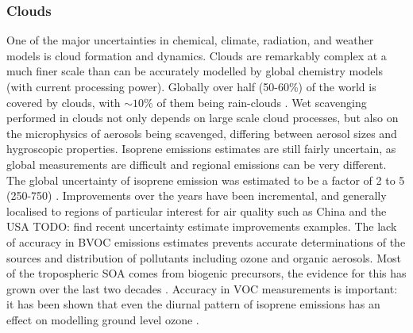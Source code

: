     \subsubsection{Clouds}
      \label{LR:Models:Uncert:Clouds}
      One of the major uncertainties in chemical, climate, radiation, and weather models is cloud formation and dynamics.
      Clouds are remarkably complex at a much finer scale than can be accurately modelled by global chemistry models (with current processing power).
      Globally over half (50-60\%) of the world is covered by clouds, with $\sim10\%$ of them being rain-clouds \citep{Kanakidou2005}.
      Wet scavenging performed in clouds not only depends on large scale cloud processes, but also on the microphysics of aerosols being scavenged, differing between aerosol sizes and hygroscopic properties.
      Isoprene emissions estimates are still fairly uncertain, as global measurements are difficult and regional emissions can be very different. 
      The global uncertainty of isoprene emission was estimated to be a factor of 2 to 5 (250-750\tgpyr) \citep{Kanakidou2005}.
      Improvements over the years have been incremental, and generally localised to regions of particular interest for air quality such as China and the USA TODO: find recent uncertainty estimate improvements examples.
      The lack of accuracy in BVOC emissions estimates prevents accurate determinations of the sources and distribution of pollutants including ozone and organic aerosols.
      Most of the tropospheric SOA comes from biogenic precursors, the evidence for this has grown over the last two decades \citep{Guenther1995, Kanakidou2005,Guenther2012}.
      Accuracy in VOC measurements is important: it has been shown that even the diurnal pattern of isoprene emissions has an effect on modelling ground level ozone \citep{Hewitt2011, Fan2004}.
    

